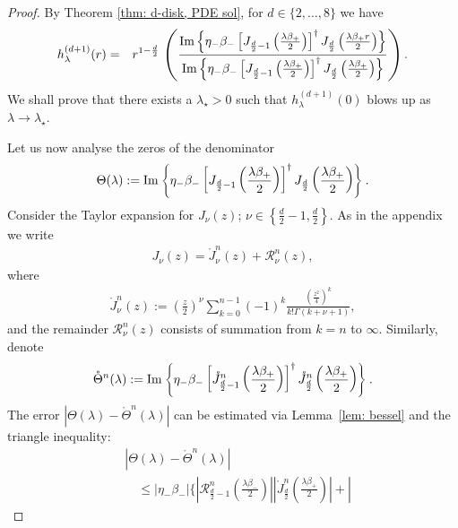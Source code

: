 \documentclass[11pt,a4paper,english,reqno]{amsart}
\theoremstyle{plain}
\newcommand{\G}{\Gamma}
\newcommand{\1}{\mathbbm{1}}
\newcommand{\maino}{\mathring{J}_{\frac{d}{2}-1}^n}
\newcommand{\maine}{\mathring{J}_{\frac{d}{2}}^n}
\newcommand{\remo}{\mathscr{R}_{\frac{d}{2}-1}^n}
\begin{document}
\begin{proof}

By Theorem \ref{thm: d-disk, PDE sol}, for $d \in \{2, \ldots, 8\}$ we have
\begin{eqnarray*}
h_{\lambda}^{(d+1)}(r) &=& r^{1-\frac{d}{2}}\,\left(\frac{{\rm Im}\left\{\eta_{-}\beta_{-}\left[J_{\frac{d}{2}-1}\left(\frac{\lambda\beta_+}{2}\right)\right]^\dagger J_{\frac{d}{2}}\left(\frac{\lambda\beta_+ r}{2}\right) \right\}}{{\rm Im}\left\{\eta_-\beta_-\left[J_{\frac{d}{2}-1}\left(\frac{\lambda\beta_+}{2}\right)\right]^\dagger J_{\frac{d}{2}}\left(\frac{\lambda\beta_+}{2}\right) \right\}}\right).  
\end{eqnarray*}
We shall prove that there exists a $\lambda_\star >0$ such that $h_{\lambda}^{(d+1)}(0)$ blows up as $\lambda \to \lambda_\star$.

Let us now analyse the zeros of the denominator
\begin{align}\label{XI}
\Theta(\lambda) := {\rm Im}\left\{\eta_-\beta_-\left[J_{\frac{d}{2}-1}\left(\frac{\lambda\beta_+}{2}\right)\right]^\dagger J_{\frac{d}{2}}\left(\frac{\lambda\beta_+}{2}\right) \right\}. 
\end{align}
Consider the Taylor expansion for $J_\nu(z)$; $\nu \in\left\{ \frac{d}{2}-1,\frac{d}{2}\right\}$. As in the appendix we write
\begin{align*}
J_{\nu}(z) = \mathring{J}_\nu^n(z) + \mathscr{R}_\nu^n(z),
\end{align*}
where
\begin{align*}
\mathring{J}_\nu^n(z)  := \left(\frac{z}{2}\right)^\nu \sum_{k=0}^{n-1} (-1)^k \frac{\left(\frac{z^2}{4}\right)^k}{k! \G(k+\nu+1)},
\end{align*}
and the remainder $\mathscr{R}_\nu^n(z)$ consists of summation from $k=n$ to $\infty$. Similarly, denote
\begin{align*}
\mathring{\Theta}^n(\lambda):={\rm Im}\left\{\eta_-\beta_-\left[\maino\left(\frac{\lambda\beta_+}{2}\right)\right]^\dagger \maine\left(\frac{\lambda\beta_+}{2}\right) \right\}.
\end{align*} The error $\left|\Theta(\lambda)-\mathring{\Theta}^n(\lambda)\right|$ can be estimated via Lemma~\ref{lem: bessel} and the triangle inequality:
\begin{align*}
&\left|\Theta(\lambda)-\mathring{\Theta}^n(\lambda)\right|\\
&\quad \leq \left|\eta_-\beta_-\right|\Bigg\{\left|\remo\left(\frac{\lambda\beta_-}{2}\right)\right| \left|\maine\left( \frac{\lambda\beta_+}{2} \right)\right| + \left|

\end{align*}
\end{proof}
\end{document}
